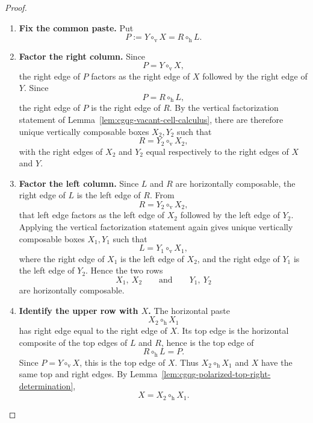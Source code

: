 \documentclass[oneside]{article}
\theoremstyle{plain}
\theoremstyle{definition}
\theoremstyle{remark}
\begin{document}
\begin{proof}
    \leavevmode
    \begin{enumerate}[beginpenalty=10000]
        \item \textbf{Fix the common paste.}
        Put
        \[
            P:=Y\circ_{\mathrm v}X
            =
            R\circ_{\mathrm h}L.
        \]

        \item \textbf{Factor the right column.}
        Since
        \[
            P=Y\circ_{\mathrm v}X,
        \]
        the right edge of \(P\) factors as the right edge of \(X\)
        followed by the right edge of \(Y\). Since
        \[
            P=R\circ_{\mathrm h}L,
        \]
        the right edge of \(P\) is the right edge of \(R\).
        By the vertical factorization statement of
        Lemma~\ref{lem:cgqg-vacant-cell-calculus}, there are therefore
        unique vertically composable boxes \(X_2,Y_2\) such that
        \[
            R=Y_2\circ_{\mathrm v}X_2,
        \]
        with the right edges of \(X_2\) and \(Y_2\) equal respectively
        to the right edges of \(X\) and \(Y\).

        \item \textbf{Factor the left column.}
        Since \(L\) and \(R\) are horizontally composable, the right
        edge of \(L\) is the left edge of \(R\). From
        \[
            R=Y_2\circ_{\mathrm v}X_2,
        \]
        that left edge factors as the left edge of \(X_2\) followed by
        the left edge of \(Y_2\). Applying the vertical factorization
        statement again gives unique vertically composable boxes
        \(X_1,Y_1\) such that
        \[
            L=Y_1\circ_{\mathrm v}X_1,
        \]
        where the right edge of \(X_1\) is the left edge of \(X_2\),
        and the right edge of \(Y_1\) is the left edge of \(Y_2\).
        Hence the two rows
        \[
            X_1,\ X_2
            \qquad\text{and}\qquad
            Y_1,\ Y_2
        \]
        are horizontally composable.

        \item \textbf{Identify the upper row with \(X\).}
        The horizontal paste
        \[
            X_2\circ_{\mathrm h}X_1
        \]
        has right edge equal to the right edge of \(X\). Its top edge is
        the horizontal composite of the top edges of \(L\) and \(R\),
        hence is the top edge of
        \[
            R\circ_{\mathrm h}L=P.
        \]
        Since \(P=Y\circ_{\mathrm v}X\), this is the top edge of \(X\).
        Thus \(X_2\circ_{\mathrm h}X_1\) and \(X\) have the same top
        and right edges. By
        Lemma~\ref{lem:cgqg-polarized-top-right-determination},
        \[
            X=X_2\circ_{\mathrm h}X_1.
        \]


\end{enumerate}
\end{proof}
\end{document}
